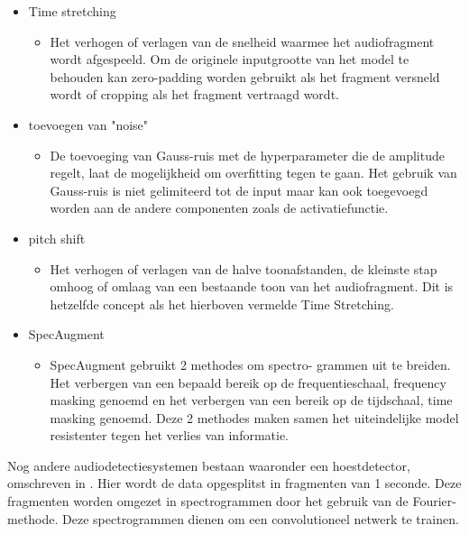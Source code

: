 \documentclass{hogent-article}
\begin{document}
\begin{itemize}

	
	\item Time stretching \autocite{Wei_2020}
	\bigbreak 
	\begin{itemize}
		\item Het verhogen of verlagen van de snelheid waarmee het audiofragment wordt afgespeeld. Om de originele inputgrootte van het model te behouden kan zero-padding worden gebruikt als het fragment versneld wordt of cropping als het fragment vertraagd wordt.
		 
	\end{itemize}
	\bigbreak
	\item toevoegen van "noise" \autocite{Wei_2020}
	\bigbreak
	\begin{itemize}
		\item De toevoeging van Gauss-ruis met de hyperparameter die de amplitude regelt, laat de mogelijkheid om overfitting tegen te gaan. \newline Het gebruik van Gauss-ruis is niet gelimiteerd tot de input maar kan ook toegevoegd worden aan de andere componenten zoals de activatiefunctie.
	\end{itemize}
	\bigbreak
	\break
	\item pitch shift \autocite{Wei_2020}
	\bigbreak 
	\begin{itemize}
		\item Het verhogen of verlagen van de halve toonafstanden, de kleinste stap omhoog of omlaag van een bestaande toon van het audiofragment.  Dit is hetzelfde concept als het hierboven vermelde Time Stretching.
			
	\end{itemize}
	\bigbreak

	\item SpecAugment \autocite{Park_2019}
	\bigbreak
	\begin{itemize}
		\item SpecAugment gebruikt 2 methodes om spectro- grammen uit te breiden.  Het verbergen van een bepaald bereik op de frequentieschaal, frequency masking genoemd en het verbergen van een bereik op de tijdschaal, time masking genoemd.
		Deze 2 methodes maken samen het uiteindelijke model  resistenter tegen het verlies van informatie. 
		
		
		
	\end{itemize}
\end{itemize}
\bigbreak
\noindent
Nog andere audiodetectiesystemen bestaan waaronder een  hoestdetector, omschreven in \cite{Kvapilova_2019}.  Hier wordt de  data opgesplitst in fragmenten van 1 seconde. Deze fragmenten worden omgezet in spectrogrammen door het gebruik van de Fourier-methode. Deze spectrogrammen  dienen om een convolutioneel netwerk te trainen.
\end{document}
